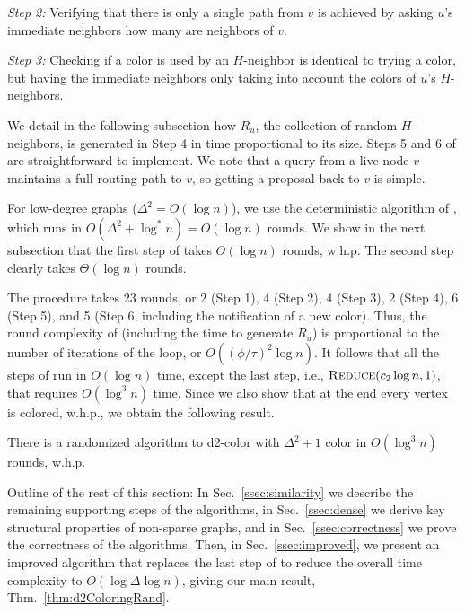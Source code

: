\emph{Step 2:}
Verifying that there is only a single path from $v$ is achieved by asking $u$'s immediate neighbors how many are neighbors of $v$. 

\emph{Step 3:} Checking if a color is used by an $H$-neighbor is identical to trying a color, but having the immediate neighbors only taking into account the colors of $u$'s $H$-neighbors.

We detail in the following subsection how $R_u$, the collection of random $H$-neighbors, is generated in Step 4 in time proportional to its size. 
Steps 5 and 6 of  are straightforward to implement. We note that a query from a live node $v$ maintains a full routing path to $v$, so getting a proposal back to $v$ is simple.


%
For low-degree graphs ($\Delta^2 = O(\log n)$), we use the deterministic algorithm of , which runs in $O(\Delta^2 + \log^* n) = O(\log n)$ rounds.
We show in the next subsection that the first step of  takes $O(\log n)$ rounds, w.h.p.
The second step clearly takes $\Theta(\log n)$ rounds.

The procedure  takes 23 rounds, or 2 (Step 1), 4 (Step 2), 4 (Step 3), 2 (Step 4), 6 (Step 5), and 5 (Step 6, including the notification of a new color).
Thus, the round complexity of  (including the time to generate $R_u$) is proportional to the number of iterations of the loop, or $O((\phi/\tau)^2 \log n)$.
It follows that all the steps of  run in $O(\log n)$ time, except the last step, i.e., $\textsc{Reduce}(c_2\log n,1)$, that requires $O(\log^3 n)$ time.
Since we also show that at the end every vertex is colored, w.h.p., we obtain the following result.

\begin{corollary}
  There is a randomized {\congest} algorithm to d2-color with $\Delta^2+1$ color in $O(\log^3 n)$ rounds, w.h.p.
  \label{C:first-rand-result}
\end{corollary}



Outline of the rest of this section: In Sec.~\ref{ssec:similarity} we describe the remaining supporting steps of the algorithms, in Sec.~\ref{ssec:dense} we derive key structural properties of non-sparse graphs, and in Sec.~\ref{ssec:correctness} we prove the correctness of the algorithms. 
%
Then, in Sec.~\ref{ssec:improved}, we present an improved algorithm that replaces the last step of  to reduce the overall time complexity to $O(\log \Delta \log n)$, giving our main result, Thm.~\ref{thm:d2ColoringRand}.

